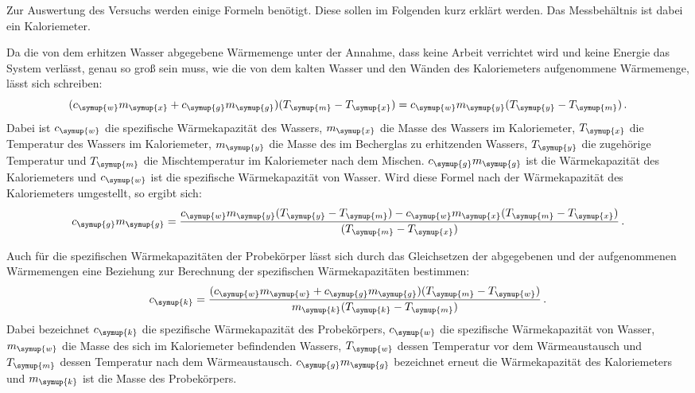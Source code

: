 Zur Auswertung des Versuchs werden einige Formeln benötigt. Diese sollen im Folgenden kurz
erklärt werden. Das Messbehältnis ist dabei ein Kaloriemeter.

Da die von dem erhitzen Wasser abgegebene Wärmemenge unter der Annahme, dass keine
Arbeit verrichtet wird und keine Energie das System verlässt, genau so groß sein
muss, wie die von dem kalten Wasser und den Wänden des Kaloriemeters aufgenommene
Wärmemenge, lässt sich schreiben:
\begin{equation}
  (c_{\symup{w}}m_{\symup{x}}+c_{\symup{g}}m_{\symup{g}})(T_{\symup{m}}-T_{\symup{x}})
  =c_{\symup{w}}m_{\symup{y}}(T_{\symup{y}}-T_{\symup{m}}) \,.
\end{equation}
Dabei ist $c_{\symup{w}}$ die spezifische Wärmekapazität des Wassers,
$m_{\symup{x}}$ die Masse des Wassers im Kaloriemeter, $T_{\symup{x}}$ die
Temperatur des Wassers im Kaloriemeter, $m_{\symup{y}}$ die Masse des
im Becherglas zu erhitzenden Wassers, $T_{\symup{y}}$ die zugehörige Temperatur
und $T_{\symup{m}}$ die Mischtemperatur im Kaloriemeter nach dem Mischen. $c_{\symup{g}}m_{\symup{g}}$
ist die Wärmekapazität des Kaloriemeters und $c_{\symup{w}}$ ist die spezifische Wärmekapazität
von Wasser.
Wird diese Formel nach der Wärmekapazität des Kaloriemeters umgestellt, so ergibt sich:
\begin{equation}
  c_{\symup{g}}m_{\symup{g}}=\frac{c_{\symup{w}}m_{\symup{y}}(T_{\symup{y}}-T_{\symup{m}})
  -c_{\symup{w}}m_{\symup{x}}(T_{\symup{m}}-T_{\symup{x}})}{(T_{\symup{m}}-T_{\symup{x}})} \,.
  \label{eqn:kaloriemeter}
\end{equation}

Auch für die spezifischen Wärmekapazitäten der Probekörper lässt sich durch das Gleichsetzen der abgegebenen und der aufgenommenen
Wärmemengen eine Beziehung zur Berechnung der spezifischen Wärmekapazitäten bestimmen:
\begin{equation}
  c_{\symup{k}}=\frac{(c_{\symup{w}}m_{\symup{w}}+c_{\symup{g}}m_{\symup{g}})
  (T_{\symup{m}}-T_{\symup{w}})}{m_{\symup{k}}(T_{\symup{k}}-T_{\symup{m}})}\,.
  \label{eqn:proben}
\end{equation}
Dabei bezeichnet $c_{\symup{k}}$ die spezifische Wärmekapazität des Probekörpers,
$c_{\symup{w}}$ die spezifische Wärmekapazität von Wasser, $m_{\symup{w}}$ die
Masse des sich im Kaloriemeter befindenden Wassers, $T_{\symup{w}}$ dessen Temperatur
vor dem Wärmeaustausch und $T_{\symup{m}}$ dessen Temperatur nach dem Wärmeaustausch.
$c_{\symup{g}}m_{\symup{g}}$ bezeichnet erneut die Wärmekapazität des Kaloriemeters
und $m_{\symup{k}}$ ist die Masse des Probekörpers.
